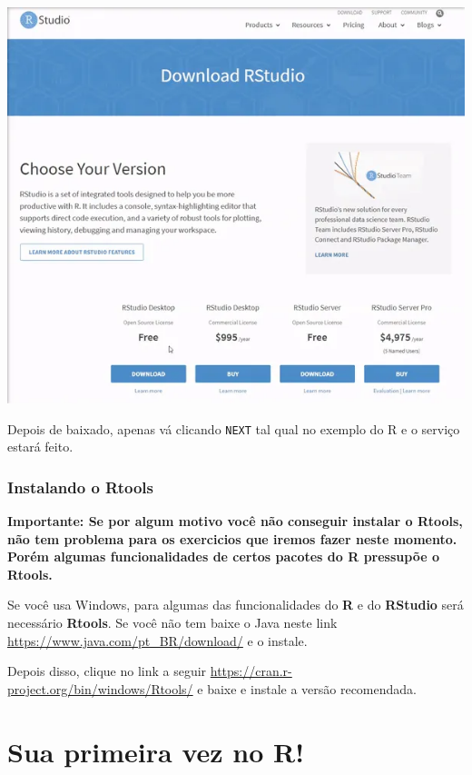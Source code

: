 \documentclass[
]{article}
\begin{document}
\includegraphics{gif_intro_download_RStudio.webp}

Depois de baixado, apenas vá clicando \texttt{NEXT} tal qual no exemplo
do R e o serviço estará feito.

\hypertarget{instalando-o-rtools}{%
\subsubsection{\texorpdfstring{Instalando o
\textbf{Rtools}}{Instalando o Rtools}}\label{instalando-o-rtools}}

\textbf{Importante: Se por algum motivo você não conseguir instalar o
Rtools, não tem problema para os exercicios que iremos fazer neste
momento. Porém algumas funcionalidades de certos pacotes do R pressupõe
o Rtools.}

Se você usa Windows, para algumas das funcionalidades do \textbf{R} e do
\textbf{RStudio} será necessário \textbf{Rtools}. Se você não tem baixe
o Java neste link \url{https://www.java.com/pt_BR/download/} e o
instale.

Depois disso, clique no link a seguir
\url{https://cran.r-project.org/bin/windows/Rtools/} e baixe e instale a
versão recomendada.

\hypertarget{sua-primeira-vez-no-r}{%
\section{\texorpdfstring{Sua primeira vez no
\textbf{R}!}{Sua primeira vez no R!}}\label{sua-primeira-vez-no-r}}
\end{document}
